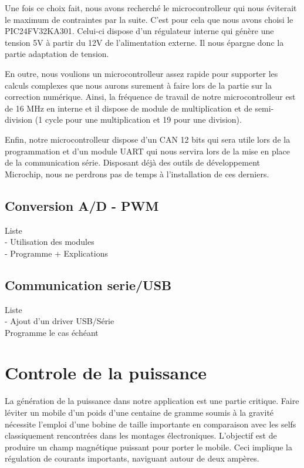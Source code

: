 \documentclass[11pt, french]{article} %
\begin{document}
Une fois ce choix fait, nous avons recherché le microcontrolleur qui nous éviterait le maximum de contraintes par la suite. C'est pour cela que nous avons choisi le PIC24FV32KA301. Celui-ci dispose d'un régulateur interne qui génère une tension 5V à partir du 12V de l'alimentation externe. Il nous épargne donc la partie adaptation de tension. 

En outre, nous voulions un microcontrolleur assez rapide pour supporter les calculs complexes que nous aurons surement à faire lors de la partie sur la correction numérique. Ainsi, la fréquence de travail de notre microcontrolleur est de 16 MHz en interne et il dispose de module de multiplication et de semi-division (1 cycle pour une multiplication et 19 pour une division). 

Enfin, notre microcontrolleur dispose d'un CAN 12 bits qui sera utile lors de la programmation et d'un module UART qui nous servira lors de la mise en place de la communication série. Disposant déjà des outils de développement Microchip, nous ne perdrons pas de temps à l'installation de ces derniers. 



\subsection{Conversion A/D - PWM}
Liste
\\- Utilisation des modules
\\- Programme + Explications

\subsection{Communication serie/USB}
Liste
\\- Ajout d'un driver USB/Série
\\ Programme le cas échéant

\section{Controle de la puissance}

	La génération de la puissance dans notre application est une partie critique. Faire léviter un mobile d'un poids d'une centaine de gramme soumis à la gravité nécessite l'emploi d'une bobine de taille importante en comparaison avec les selfs classiquement rencontrées dans les montages électroniques. L'objectif est de produire un champ magnétique puissant pour porter le mobile. Ceci implique la régulation de courants importants, naviguant autour de deux ampères. 
\end{document}
